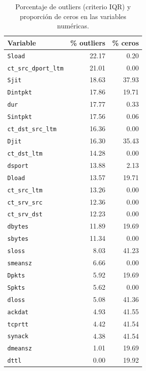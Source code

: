 \documentclass[conference]{IEEEtran}
\begin{document}
\begin{table}[h!]
\centering
\caption{Porcentaje de outliers (criterio IQR) y proporción de ceros en las variables numéricas.}
\label{tab:outliers}
\footnotesize
\begin{tabular}{lrr}
\hline
\textbf{Variable} & \textbf{\% outliers} & \textbf{\% ceros} \\
\hline
\texttt{Sload}             & 22.17 & 0.20  \\
\texttt{ct\_src\_dport\_ltm} & 21.01 & 0.00  \\
\texttt{Sjit}              & 18.63 & 37.93 \\
\texttt{Dintpkt}           & 17.86 & 19.71 \\
\texttt{dur}               & 17.77 & 0.33  \\
\texttt{Sintpkt}           & 17.56 & 0.06  \\
\texttt{ct\_dst\_src\_ltm} & 16.36 & 0.00  \\
\texttt{Djit}              & 16.30 & 35.43 \\
\texttt{ct\_dst\_ltm}      & 14.28 & 0.00  \\
\texttt{dsport}            & 13.88 & 2.13  \\
\texttt{Dload}             & 13.57 & 19.71 \\
\texttt{ct\_src\_ltm}      & 13.26 & 0.00  \\
\texttt{ct\_srv\_src}      & 12.36 & 0.00  \\
\texttt{ct\_srv\_dst}      & 12.23 & 0.00  \\
\texttt{dbytes}            & 11.89 & 19.69 \\
\texttt{sbytes}            & 11.34 & 0.00  \\
\texttt{sloss}             & 8.03  & 41.23 \\
\texttt{smeansz}           & 6.66  & 0.00  \\
\texttt{Dpkts}             & 5.92  & 19.69 \\
\texttt{Spkts}             & 5.62  & 0.00  \\
\texttt{dloss}             & 5.08  & 41.36 \\
\texttt{ackdat}            & 4.93  & 41.55 \\
\texttt{tcprtt}            & 4.42  & 41.54 \\
\texttt{synack}            & 4.38  & 41.54 \\
\texttt{dmeansz}           & 1.01  & 19.69 \\
\texttt{dttl}              & 0.00  & 19.92 \\

\end{tabular}
\end{table}
\end{document}
